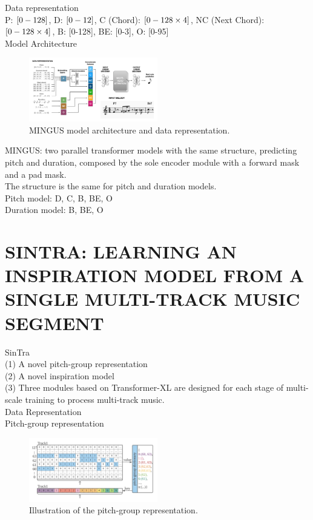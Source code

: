 \documentclass{article}
\begin{document}
\noindent
Data representation\\
P: ${\rm [0-128]}$, D: ${\rm [0-12]}$, C (Chord): ${\rm [0-128\times4]}$, NC (Next Chord): ${\rm [0-128\times4]}$, B: {\rm [0-128]},  BE: {\rm [0-3]}, O: {\rm [0-95]}\\

\noindent
Model Architecture
\begin{figure}[H]
   \centerline{
   \includegraphics[width=0.5\textwidth]{Fig7.png}}
   \caption{MINGUS model architecture and data representation.}
   \label{fig:example}
\end{figure}

\noindent
MINGUS: two parallel transformer models with the same structure, predicting pitch and duration, composed by the sole encoder module with a forward mask and a pad mask.\\
The structure is the same for pitch and duration models.\\
Pitch model: D, C, B, BE, O\\
Duration model: B, BE, O\\

\section{SINTRA: LEARNING AN INSPIRATION MODEL FROM A SINGLE MULTI-TRACK MUSIC SEGMENT}
SinTra\\
(1) A novel pitch-group representation\\
(2) A novel inspiration model\\
(3) Three modules based on Transformer-XL are designed for each stage of multi-scale training to process multi-track music.\\

\noindent
Data Representation\\
Pitch-group representation
\begin{figure}[H]
	\centerline{
   \includegraphics[width=0.5\textwidth]{Fig8.png}}
   \caption{Illustration of the pitch-group representation.}
   \label{fig:example}
\end{figure}
\end{document}
